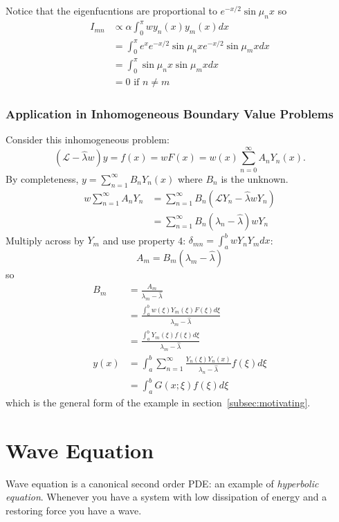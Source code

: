 \documentclass[a4paper]{article}
\renewcommand*{\L}{\mathcal{L}}
\begin{document}
\begin{enumerate}
Notice that the eigenfucntions are proportional to \(e^{-x/2}\sin\mu_nx\) so
\begin{align*}
  I_{mn} &\propto \alpha\int_{0}^{\pi} wy_n(x)y_m(x) dx \\
         &= \int_{0}^{\pi} e^x e^{-x/2}\sin\mu_nx e^{-x/2}\sin\mu_mx dx \\
         &= \int_{0}^{\pi} \sin\mu_nx \sin\mu_mx dx \\
         &= 0 \text{ if } n \neq m
\end{align*}
\end{enumerate}

\subsubsection{Application in Inhomogeneous Boundary Value Problems}

Consider this inhomogeneous problem:
\[
  (\L - \hat \lambda w)y = f(x) = wF(x) = w(x) \sum_{n=0}^{\infty} A_nY_n(x).
\]
By completeness, \(y = \sum_{n=1}^{\infty} B_nY_n(x) \) where \(B_n\) is the unknown.
\begin{align*}
  w \sum_{n=1}^{\infty}A_nY_n &= \sum_{n=1}^{\infty}B_n (\L Y_n - \hat \lambda w Y_n) \\
  &= \sum_{n=1}^{\infty}B_n(\lambda_n-\hat \lambda)wY_n
\end{align*}
Multiply across by \(Y_m\) and use property 4: \(\delta_{mn} = \int_{a}^{b} wY_nY_m dx \):
\[
  A_m = B_m(\lambda_m-\hat \lambda)
\]
so
\begin{align*}
  B_m &= \frac{A_m}{\lambda_m-\hat\lambda} \\
      &= \frac{\int_{a}^{b} w(\xi)Y_m(\xi)F(\xi) d\xi}{\lambda_m-\hat\lambda} \\
      &= \frac{\int_{a}^{b} Y_m(\xi)f(\xi) d\xi}{\lambda_m-\hat\lambda} \\ 
  y(x) &= \int_{a}^{b}  \sum_{n=1}^{\infty} \frac{Y_n(\xi)Y_n(x)}{\lambda_n-\hat \lambda} f(\xi) d\xi \\
      &= \int_{a}^{b} G(x;\xi)f(\xi) d\xi
\end{align*}
which is the general form of the example in section~\ref{subsec:motivating}.


\section{Wave Equation}

Wave equation is a canonical second order PDE: an example of \emph{hyperbolic equation}. Whenever you have a system with low dissipation of energy and a restoring force you have a wave.
\end{document}

